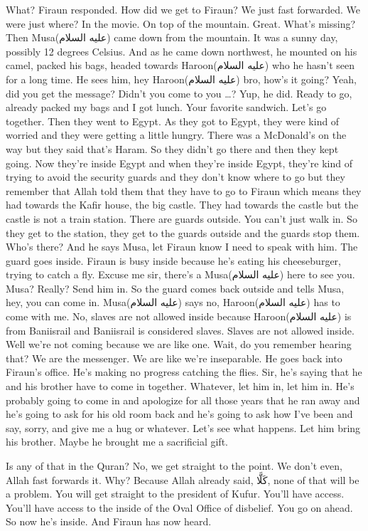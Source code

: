 \documentclass[12pt]{article}
\newcommand{\as}{\textarabic{(عليه السلام)}}
\begin{document}
What? Firaun responded. How did we get to Firaun? We just fast forwarded. We were just where? In the movie. On top of the mountain. Great. What's missing? Then Musa\as{} came down from the mountain. It was a sunny day, possibly 12 degrees Celsius. And as he came down northwest, he mounted on his camel, packed his bags, headed towards Haroon\as{} who he hasn't seen for a long time. He sees him, hey Haroon\as{} bro, how's it going? Yeah, did you get the message? Didn't you come to you \dots? Yup, he did. Ready to go, already packed my bags and I got lunch. Your favorite sandwich. Let's go together. Then they went to Egypt. As they got to Egypt, they were kind of worried and they were getting a little hungry. There was a McDonald's on the way but they said that's Haram. So they didn't go there and then they kept going. Now they're inside Egypt and when they're inside Egypt, they're kind of trying to avoid the security guards and they don't know where to go but they remember that Allah told them that they have to go to Firaun which means they had towards the Kafir house, the big castle. They had towards the castle but the castle is not a train station. There are guards outside. You can't just walk in. So they get to the station, they get to the guards outside and the guards stop them. Who's there? And he says Musa, let Firaun know I need to speak with him. The guard goes inside. Firaun is busy inside because he's eating his cheeseburger, trying to catch a fly. Excuse me sir, there's a Musa\as{} here to see you. Musa? Really? Send him in. So the guard comes back outside and tells Musa, hey, you can come in. Musa\as{} says no, Haroon\as{} has to come with me. No, slaves are not allowed inside because Haroon\as{} is from Baniisrail and Baniisrail is considered slaves. Slaves are not allowed inside. Well we're not coming because we are like one. Wait, do you remember hearing that? We are the messenger. We are like we're inseparable. He goes back into Firaun's office. He's making no progress catching the flies. Sir, he's saying that he and his brother have to come in together. Whatever, let him in, let him in. He's probably going to come in and apologize for all those years that he ran away and he's going to ask for his old room back and he's going to ask how I've been and say, sorry, and give me a hug or whatever. Let's see what happens. Let him bring his brother. Maybe he brought me a sacrificial gift. 

Is any of that in the Quran? No, we get straight to the point. We don't even, Allah fast forwards it. Why? Because Allah already said, \textarabic{كَلَّا}, none of that will be a problem. You will get straight to the president of Kufur. You'll have access. You'll have access to the inside of the Oval Office of disbelief. You go on ahead. So now he's inside. And Firaun has now heard. 
\end{document}
